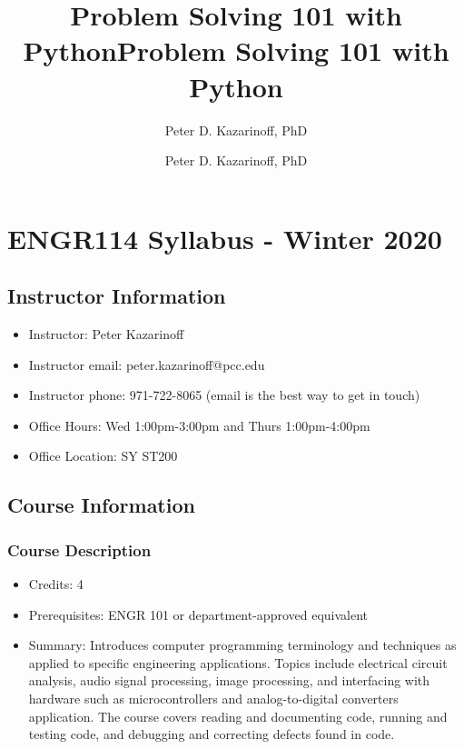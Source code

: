 \documentclass[11pt]{article}
\title{Problem Solving 101 with Python}
\author{Peter D. Kazarinoff, PhD}
\date{}
\title{Problem Solving 101 with Python}
\author{Peter D. Kazarinoff, PhD}
\date{}
\providecommand{\tightlist}{%
      \setlength{\itemsep}{0pt}\setlength{\parskip}{0pt}}
\begin{document}
    
    

    
    

    
    \hypertarget{engr114-syllabus---winter-2020}{%
\section{ENGR114 Syllabus - Winter
2020}\label{engr114-syllabus---winter-2020}}

    \hypertarget{instructor-information}{%
\subsection{Instructor Information}\label{instructor-information}}

\begin{itemize}
\tightlist
\item
  Instructor: Peter Kazarinoff
\item
  Instructor email: peter.kazarinoff@pcc.edu
\item
  Instructor phone: 971-722-8065 (email is the best way to get in touch)
\item
  Office Hours: Wed 1:00pm-3:00pm and Thurs 1:00pm-4:00pm
\item
  Office Location: SY ST200
\end{itemize}

    \hypertarget{course-information}{%
\subsection{Course Information}\label{course-information}}

\hypertarget{course-description}{%
\subsubsection{Course Description}\label{course-description}}

\begin{itemize}
\tightlist
\item
  Credits: 4
\item
  Prerequisites: ENGR 101 or department-approved equivalent
\item
  Summary: Introduces computer programming terminology and techniques as
  applied to specific engineering applications. Topics include
  electrical circuit analysis, audio signal processing, image
  processing, and interfacing with hardware such as microcontrollers and
  analog-to-digital converters application. The course covers reading
  and documenting code, running and testing code, and debugging and
  correcting defects found in code.
\end{itemize}
\end{document}
